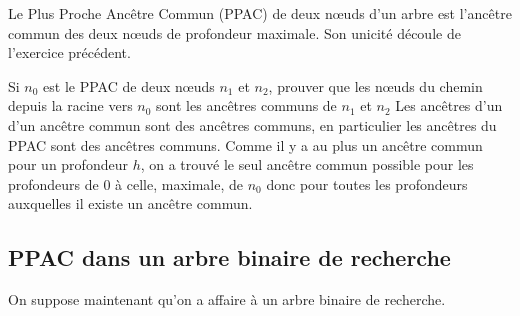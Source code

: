 Le {\sc Plus Proche Ancêtre Commun} (PPAC) de deux nœuds d'un arbre est l'ancêtre commun des deux nœuds de profondeur maximale. Son unicité découle de l'exercice précédent.
\begin{question}{}{}
Si $n_0$ est le PPAC de deux nœuds $n_1$ et $n_2$, prouver que les nœuds du chemin depuis la racine vers $n_0$ sont les ancêtres communs de $n_1$ et $n_2$
\reponse
Les ancêtres d'un d'un ancêtre commun sont des ancêtres communs, en particulier les ancêtres du PPAC sont des ancêtres communs. Comme il y a au plus un ancêtre commun pour un profondeur $h$, on a trouvé le seul ancêtre commun possible pour les profondeurs de 0 à celle, maximale, de $n_0$ donc pour toutes les profondeurs auxquelles il existe un ancêtre commun.
\end{question}
\subsection{PPAC dans un arbre binaire de recherche}
On suppose maintenant qu'on a affaire à un arbre binaire de recherche.

